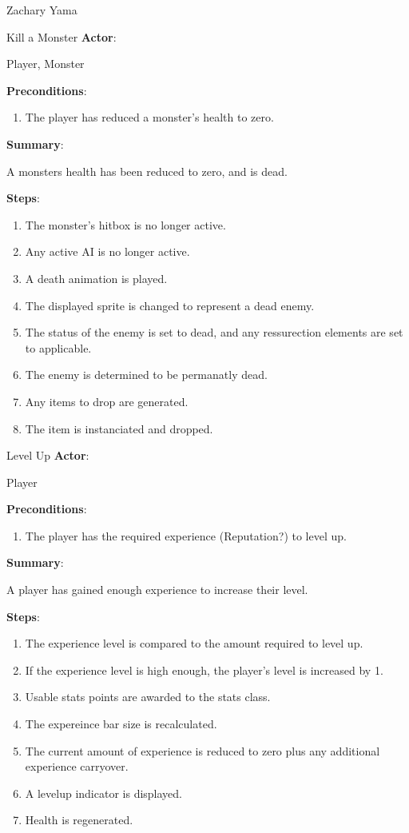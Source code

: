 \documentclass[12pt]{report}
\begin{document}
\begin{section}{Zachary Yama}
\begin{subsection}{Kill a Monster}
\textbf{Actor}:

Player, Monster

\textbf{Preconditions}:

\begin{enumerate}
\item The player has reduced a monster's health to zero.
\end{enumerate}

\textbf{Summary}:

A monsters health has been reduced to zero, and is dead.

\textbf{Steps}:

\begin{enumerate}
\item The monster's hitbox is no longer active.
\item Any active AI is no longer active.
\item A death animation is played.
\item The displayed sprite is changed to represent a dead enemy.
\item The status of the enemy is set to dead, and any ressurection elements
are set to applicable.
\item The enemy is determined to be permanatly dead.
\item Any items to drop are generated.
\item The item is instanciated and dropped.
\end{enumerate}
\end{subsection}

\begin{subsection}{Level Up}
\textbf{Actor}:

Player

\textbf{Preconditions}:

\begin{enumerate}
\item The player has the required experience (Reputation?) to level up.
\end{enumerate}

\textbf{Summary}:

A player has gained enough experience to increase their level. 

\textbf{Steps}:

\begin{enumerate}
\item The experience level is compared to the amount required to level up. 
\item If the experience level is high enough, the player's level is
increased by 1.
\item Usable stats points are awarded to the stats class. 
\item The expereince bar size is recalculated.
\item The current amount of experience is reduced to zero plus any
additional experience carryover.
\item A levelup indicator is displayed.
\item Health is regenerated.
\end{enumerate}
\end{subsection}


\end{section}
\end{document}
